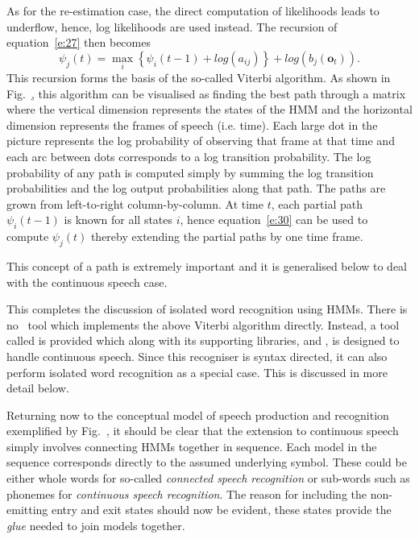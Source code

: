 As for the re-estimation case, the direct computation of likelihoods
leads to underflow, hence, log likelihoods are used instead.  The
recursion of equation~\ref{e:27} then becomes
\begin{equation} \label{e:30}
   \psi_j(t) = \max_i \left\{ \psi_i(t-1) + log(a_{ij}) \right\}
                       + log(b_j(\bm{o}_t)).
\end{equation}
This recursion forms the basis of the so-called Viterbi algorithm.
As shown in Fig.~\href{f:vtrellis}, this algorithm can be visualised
as finding the best path through a matrix where the vertical
dimension represents the states of the HMM and
the horizontal dimension represents the frames of speech (i.e. time).
Each large dot in the picture represents the log probability
of observing that frame at that time and each arc between dots
corresponds to a log transition probability.  The log probability
of any path is computed simply by summing the log transition probabilities
and the log output probabilities along that path.  The paths are
grown from left-to-right column-by-column.  At time $t$, each
partial path $\psi_i(t-1)$ is known for all states $i$, hence
equation~\ref{e:30} can be used to compute $\psi_j(t)$
thereby extending the partial paths by one time frame.


This concept of
a path is extremely important and it is generalised below to deal
with the continuous speech case.

This completes the discussion of isolated word recognition using
HMMs.  There is no \HTK\ tool which implements the above Viterbi
algorithm directly.  Instead, a tool 
called  is provided which
along with its supporting libraries,  and , 
is designed to handle continuous speech.  Since this recogniser is syntax
directed, it can also perform isolated word recognition as a special case.
This is discussed in more detail below.


Returning now to the conceptual model of speech production and
recognition exemplified by Fig.~\href{f:messencode}, it should be
clear that the extension to continuous speech simply involves
connecting HMMs together in sequence.  Each model in the sequence
corresponds directly to the assumed underlying symbol.  These
could be either whole words for so-called 
{\it connected speech recognition} or sub-words such as phonemes
for {\it continuous speech recognition}.  The reason for including
the non-emitting entry and exit 
states should now be evident, these
states provide the {\it glue} needed to join models together.

